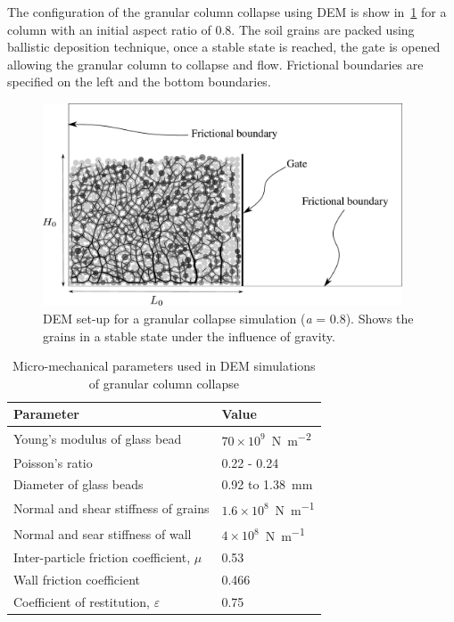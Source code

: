 The configuration of the granular column collapse using DEM is show 
in~\cref{fig:DEM_Column_Sample} for a column with an initial aspect ratio of 
0.8. The soil grains are packed using ballistic deposition technique, once a 
stable state is reached, the gate is opened allowing the granular column to 
collapse and flow. Frictional boundaries are specified on the left and 
the bottom boundaries.

\begin{figure}
\centering
\includegraphics[width=0.95\textwidth]{DEM_Column_Sample}
\caption[DEM set-up of a granular collapse simulation (\textit{a} = 0.8)]{DEM 
set-up for a granular collapse simulation (\textit{a} = 0.8). 
Shows the grains in a stable state under the influence of gravity.}
\label{fig:DEM_Column_Sample}
\end{figure}

\begin{table}
\caption{Micro-mechanical parameters used in DEM simulations of granular column 
collapse}
\label{table:DEM_data}
\centering
\begin{tabular}{ll}
\toprule
\textbf{Parameter} & \textbf{Value} \\ \midrule
Young's modulus of glass bead & 
$70\times10^{9}$~\si{\newton\per\m\squared}\\ 
Poisson's ratio & 0.22 - 0.24\\ 
Diameter of glass beads & 0.92 to 1.38~\si{\mm}\\
Normal and shear stiffness of grains & $1.6 \times 
10^{8}$~\si{\newton\per\m}\\ 
Normal and sear stiffness of wall & $4 \times 
10^{8}$~\si{\newton\per\m}\\
Inter-particle friction coefficient, $\mu$ & 0.53 \\
Wall friction coefficient & 0.466 \\ 
Coefficient of restitution, $\varepsilon$ & 0.75 \\ \bottomrule
\end{tabular}
\end{table}

